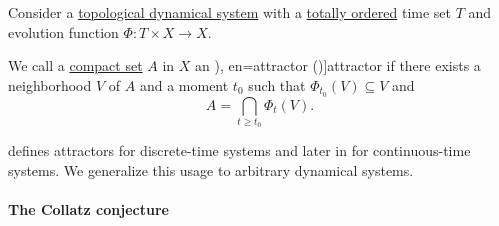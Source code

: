 \begin{definition}\label{def:dynamical_system_attractor}\mimprovised
  Consider a \hyperref[def:topological_dynamical_system]{topological dynamical system} with a \hyperref[def:totally_ordered_set]{totally ordered} time set \( T \) and evolution function \( \Phi: T \times X \to X \).

  We call a \hyperref[def:compact_space]{compact set} \( A \) in \( X \) an \term[ru=аттрактор (\cite[94]{Юмагулов2015ДинамическиеСистемы}), en=attractor (\cite[def. 3.1.1]{HasselblattKatok1995DynamicalSystems})]{attractor} if there exists a neighborhood \( V \) of \( A \) and a moment \( t_0 \) such that \( \Phi_{t_0}(V) \subseteq V \) and
  \begin{equation}\label{eq:def:dynamical_system_attractor}
    A = \bigcap_{t \geq t_0} \Phi_t(V).
  \end{equation}
\end{definition}
\begin{comments}
  \item \Textcite[94]{Юмагулов2015ДинамическиеСистемы} defines attractors for discrete-time systems and later in \cite[169]{Юмагулов2015ДинамическиеСистемы} for continuous-time systems. We generalize this usage to arbitrary dynamical systems.
\end{comments}

\paragraph{The Collatz conjecture}

